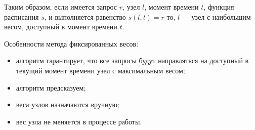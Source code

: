 Таким образом, если имеется запрос $r$, узел $l$, момент времени $t$, функция расписания $s$, и выполняется равенство $s(l, t) = r$ то, $l$ --- узел с наибольшим весом, доступный в момент времени $t$.

Особенности метода фиксированных весов:
\begin{itemize}
	\item алгоритм гарантирует, что все запросы будут направляться на доступный в текущий момент времени узел с максимальным весом;
	\item алгоритм предсказуем;
	\item веса узлов назначаются вручную;
	\item вес узла не меняется в процессе работы.
\end{itemize}